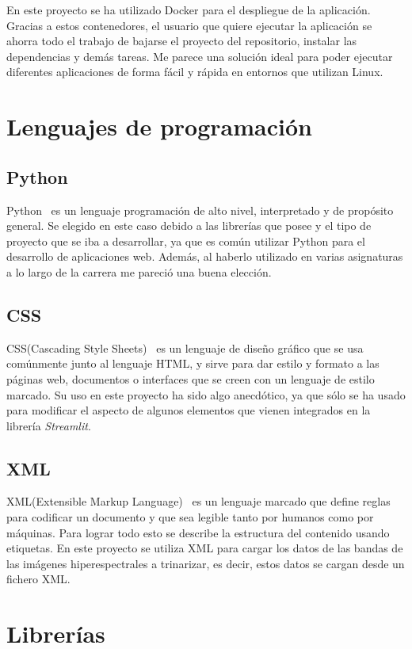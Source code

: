 En este proyecto se ha utilizado Docker para el despliegue de la aplicación. Gracias a estos contenedores, el usuario que quiere ejecutar la aplicación se ahorra todo el trabajo de bajarse el proyecto del repositorio, instalar las dependencias y demás tareas. Me parece una solución ideal para poder ejecutar diferentes aplicaciones de forma fácil y rápida en entornos que utilizan Linux.

\section{Lenguajes de programación}
\subsection{Python}
Python~\cite{wiki:Python} es un lenguaje programación de alto nivel, interpretado y de propósito general. Se elegido en este caso debido a las librerías que posee y el tipo de proyecto que se iba a desarrollar, ya que es común utilizar Python para el desarrollo de aplicaciones web. Además, al haberlo utilizado en varias asignaturas a lo largo de la carrera me pareció una buena elección.

\subsection{CSS}
CSS(Cascading Style Sheets)~\cite{wiki:CSS} es un lenguaje de diseño gráfico que se usa comúnmente junto al lenguaje HTML, y sirve para dar estilo y formato a las páginas web, documentos o interfaces que se creen con un lenguaje de estilo marcado.
Su uso en este proyecto ha sido algo anecdótico, ya que sólo se ha usado para modificar el aspecto de algunos elementos que vienen integrados en la librería \textit{Streamlit}.
\subsection{XML}
XML(Extensible Markup Language)~\cite{wiki:XML} es un lenguaje marcado que define reglas para codificar un documento y que sea legible tanto por humanos como por máquinas. Para lograr todo esto se describe la estructura del contenido usando etiquetas. En este proyecto se utiliza XML para cargar los datos de las bandas de las imágenes hiperespectrales a trinarizar, es decir, estos datos se cargan desde un fichero XML.

\section{Librerías}
